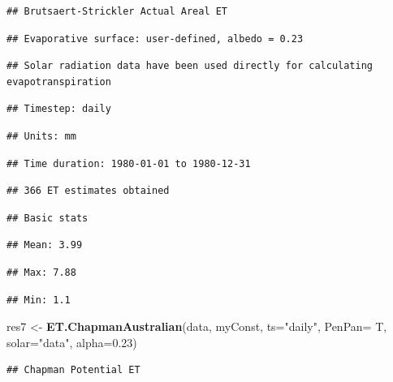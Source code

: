 \documentclass[
]{book}
\newenvironment{Shaded}{\begin{snugshade}}{\end{snugshade}}
\newcommand{\DataTypeTok}[1]{\textcolor[rgb]{0.13,0.29,0.53}{#1}}
\newcommand{\FloatTok}[1]{\textcolor[rgb]{0.00,0.00,0.81}{#1}}
\newcommand{\KeywordTok}[1]{\textcolor[rgb]{0.13,0.29,0.53}{\textbf{#1}}}
\newcommand{\NormalTok}[1]{#1}
\newcommand{\StringTok}[1]{\textcolor[rgb]{0.31,0.60,0.02}{#1}}
\begin{document}
\begin{verbatim}
## Brutsaert-Strickler Actual Areal ET
\end{verbatim}

\begin{verbatim}
## Evaporative surface: user-defined, albedo = 0.23
\end{verbatim}

\begin{verbatim}
## Solar radiation data have been used directly for calculating evapotranspiration
\end{verbatim}

\begin{verbatim}
## Timestep: daily
\end{verbatim}

\begin{verbatim}
## Units: mm
\end{verbatim}

\begin{verbatim}
## Time duration: 1980-01-01 to 1980-12-31
\end{verbatim}

\begin{verbatim}
## 366 ET estimates obtained
\end{verbatim}

\begin{verbatim}
## Basic stats
\end{verbatim}

\begin{verbatim}
## Mean: 3.99
\end{verbatim}

\begin{verbatim}
## Max: 7.88
\end{verbatim}

\begin{verbatim}
## Min: 1.1
\end{verbatim}

\begin{Shaded}
\begin{Highlighting}[]
\NormalTok{res7 <-}\StringTok{ }\KeywordTok{ET.ChapmanAustralian}\NormalTok{(data, myConst, }\DataTypeTok{ts=}\StringTok{"daily"}\NormalTok{, }\DataTypeTok{PenPan=}\NormalTok{ T, }
                             \DataTypeTok{solar=}\StringTok{"data"}\NormalTok{, }\DataTypeTok{alpha=}\FloatTok{0.23}\NormalTok{)}
\end{Highlighting}
\end{Shaded}

\begin{verbatim}
## Chapman Potential ET
\end{verbatim}
\end{document}
